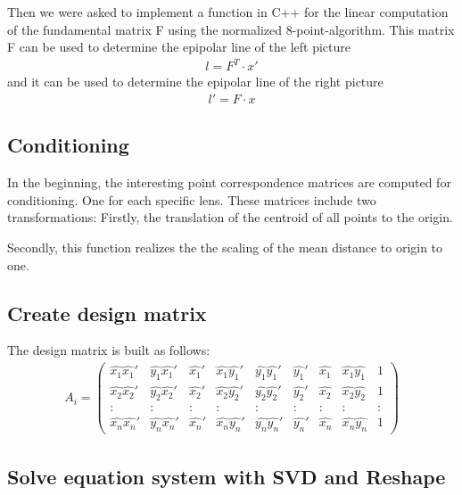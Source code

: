 \documentclass[a4paper,headings=small]{scrartcl}
\numberwithin{equation}{section} %
\numberwithin{figure}{section}   %
\begin{document}
Then we were asked to implement a function in C++ for the linear computation of the fundamental
matrix F using the normalized 8-point-algorithm.
This matrix F can be used to determine the epipolar line of the left picture
   \begin{align}
       l = F^T \cdot x'
   \end{align}
and it can be used to determine the epipolar line of the right picture
   \begin{align}
       l' = F \cdot x
   \end{align}

  \subsection{Conditioning}

  In the beginning, the interesting point correspondence matrices are computed for conditioning.
  One for each specific lens.
  These matrices include two transformations: 
  Firstly, the translation of the centroid of all points to the origin.

  Secondly, this function realizes the the scaling of the mean distance to origin to one.

  \subsection{Create design matrix}

  The design matrix is built as follows: \\
  \begin{align}
  A_{i}=
  \left( \begin{array}{ccccccccc}
  \hat{x_1}\hat{x_1}' & \hat{y_1}\hat{x_1}' & \hat{x_1}' & \hat{x_1}\hat{y_1}' & \hat{y_1}\hat{y_1}' & \hat{y_1}' & \hat{x_1} & \hat{x_1}\hat{y_1} & 1\\
  \hat{x_2}\hat{x_2}' & \hat{y_2}\hat{x_2}' & \hat{x_2}' & \hat{x_2}\hat{y_2}' & \hat{y_2}\hat{y_2}' & \hat{y_2}' & \hat{x_2} & \hat{x_2}\hat{y_2} & 1\\
   : & : & : & : & : & : & : & : & : \\
  \hat{x_n}\hat{x_n}' & \hat{y_n}\hat{x_n}' & \hat{x_n}' & \hat{x_n}\hat{y_n}' & \hat{y_n}\hat{y_n}' & \hat{y_n}' & \hat{x_n} & \hat{x_n}\hat{y_n} & 1
  \end{array} \right) 
  \end{align}

  \subsection{Solve equation system with SVD and Reshape}
\end{document}
